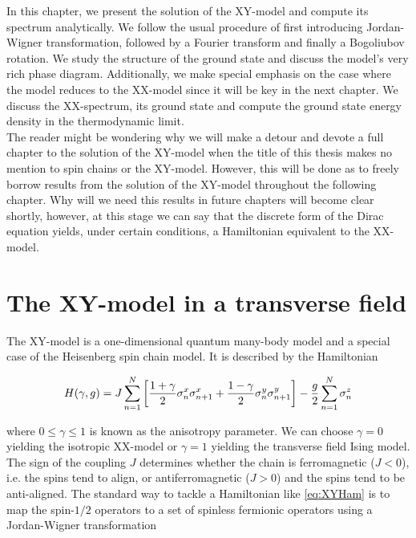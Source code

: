 In this chapter, we present the solution of the XY-model and compute its spectrum analytically. We follow the usual procedure of first introducing Jordan-Wigner transformation, followed by a Fourier transform and finally a Bogoliubov rotation. We study the structure of the ground state and discuss the model's very rich phase diagram. Additionally, we make special emphasis on the case where the model reduces to the XX-model since it will be key in the next chapter. We discuss the XX-spectrum, its ground state and compute the ground state energy density in the thermodynamic limit.\\

The reader might be wondering why we will make a detour and devote a full chapter to the solution of the XY-model when the title of this thesis makes no mention to spin chains or the XY-model. However, this will be done as to freely borrow results from the solution of the XY-model throughout the following chapter. Why will we need this results in future chapters will become clear shortly, however, at this stage we can say that the discrete form of the Dirac equation yields, under certain conditions, a Hamiltonian equivalent to the XX-model.
 

\section{The XY-model in a transverse field}\label{sec:XYmodel}

The XY-model is a one-dimensional quantum many-body model and a special case of the Heisenberg spin chain model. It is described by the Hamiltonian

\begin{equation}
H(\gamma,g) = J \sum_{n=1}^ N\qty[\frac{1+\gamma}{2}\sigma^x_n\sigma^x_{n+1} +\frac{1-\gamma}{2}\sigma^y_n\sigma^y_{n+1} ] - \frac{g}{2}\sum_{n=1}^N\sigma^z_n\label{eq:XYHam}
\end{equation}

where $0\leq\gamma\leq 1$ is known as the anisotropy parameter. We can choose $\gamma=0$ yielding the isotropic XX-model or $\gamma=1$ yielding the transverse field Ising model. The sign of the coupling $J$ determines whether the chain is ferromagnetic ($J<0$), i.e. the spins tend to align, or antiferromagnetic ($J>0$)  and the spins tend to be anti-aligned. The standard way to tackle a Hamiltonian like \eqref{eq:XYHam} is to map the spin-$1/2$ operators to a set of spinless fermionic operators using a Jordan-Wigner transformation


